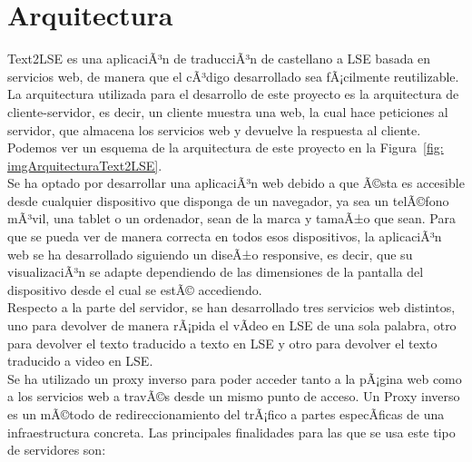 \section{Arquitectura}
\label{cap4:sec:Arquitectura}

Text2LSE es una aplicaciÃ³n de traducciÃ³n de castellano a LSE basada en servicios web, de manera que el cÃ³digo desarrollado sea fÃ¡cilmente reutilizable. La arquitectura utilizada para el desarrollo de este proyecto es la arquitectura de cliente-servidor, es decir, un cliente muestra una web, la cual hace peticiones al servidor, que almacena los servicios web y devuelve la respuesta al cliente. Podemos ver un esquema de la arquitectura de este proyecto en la Figura~\ref {fig: imgArquitecturaText2LSE}.\\

Se ha optado por desarrollar una aplicaciÃ³n web debido a que Ã©sta es accesible desde cualquier dispositivo que disponga de un navegador, ya sea un telÃ©fono mÃ³vil, una tablet o un ordenador, sean de la marca y tamaÃ±o que sean. Para que se pueda ver de manera correcta en todos esos dispositivos, la aplicaciÃ³n web se ha desarrollado siguiendo un diseÃ±o responsive, es decir, que su visualizaciÃ³n se adapte dependiendo de las dimensiones de la pantalla del dispositivo desde el cual se estÃ© accediendo.\\

Respecto a la parte del servidor, se han desarrollado tres servicios web distintos, uno para devolver de manera rÃ¡pida el vÃ­deo en LSE de una sola palabra, otro para devolver el texto traducido a texto en LSE y otro para devolver el texto traducido a video en LSE. \\

Se ha utilizado un proxy inverso para poder acceder tanto a la pÃ¡gina web como a los servicios web a travÃ©s desde un mismo punto de acceso. Un Proxy inverso \citep*{proxyInverso} es un mÃ©todo de redireccionamiento del trÃ¡fico a partes especÃ­ficas de una infraestructura concreta. Las principales finalidades para las que se usa este tipo de servidores son:

